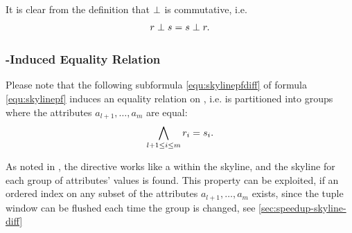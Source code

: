 \noindent
It is clear from the definition that $\perp$ is commutative, i.e.
\[
r \perp s = s \perp r.
\]


%

\subsubsection{-Induced Equality Relation}
Please note that the following subformula \eqref{equ:skylinepfdiff} of
formula \eqref{equ:skylinepf} induces an equality relation on
, i.e.  is partitioned into groups where the
attributes $a_{l+1}, \ldots, a_m$ are equal:
\begin{equation}\label{equ:skylinepfdiff}
\bigwedge_{l+1 \le i \le m} r_i = s_i.
\end{equation}

As noted in \citep{Chomicki2003}, the  directive works
like a  within the skyline, and the skyline for
each group of  attributes' values is found.
%
This property can be exploited, if an ordered index on any subset of
the attributes $a_{l+1}, \ldots, a_m$ exists, since the tuple window
can be flushed each time the group is changed, see
\autoref{sec:speedup-skyline-diff}

%
% 


